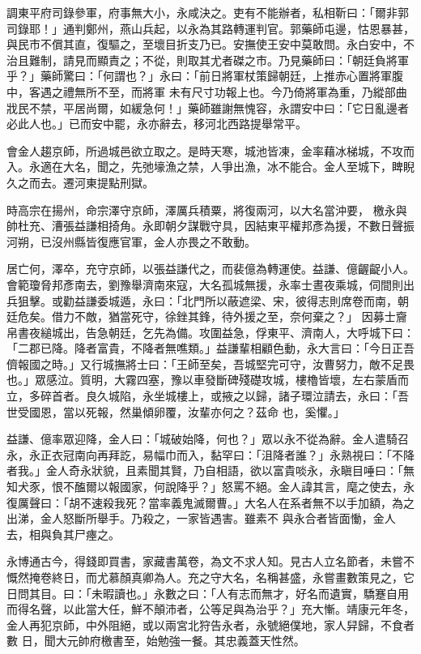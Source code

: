 \begin{pinyinscope}
 調東平府司錄參軍，府事無大小，永咸決之。吏有不能辦者，私相靳曰：「爾非郭司錄耶！」通判鄭州，燕山兵起，以永為其路轉運判官。郭藥師屯邊，怙恩暴甚，與民市不償其直，復驅之，至壞目折支乃已。安撫使王安中莫敢問。永白安中，不治且難制，請見而顯責之；不從，則取其尤者磔之市。乃見藥師曰：「朝廷負將軍乎？」藥師驚曰：「何謂也？」永曰：「前日將軍杖策歸朝廷，上推赤心置將軍腹中，客遇之禮無所不至，而將軍
 未有尺寸功報上也。今乃倚將軍為重，乃縱部曲戕民不禁，平居尚爾，如緩急何！」藥師雖謝無愧容，永謂安中曰：「它日亂邊者必此人也。」已而安中罷，永亦辭去，移河北西路提舉常平。



 會金人趨京師，所過城邑欲立取之。是時天寒，城池皆凍，金率藉冰梯城，不攻而入。永適在大名，聞之，先弛壕漁之禁，人爭出漁，冰不能合。金人至城下，睥睨久之而去。遷河東提點刑獄。



 時高宗在揚州，命宗澤守京師，澤厲兵積粟，將復兩河，以大名當沖要，
 檄永與帥杜充、漕張益謙相掎角。永即朝夕謀戰守具，因結東平權邦彥為援，不數日聲振河朔，已沒州縣皆復應官軍，金人亦畏之不敢動。



 居亡何，澤卒，充守京師，以張益謙代之，而裴億為轉運使。益謙、億齷齪小人。會範瓊脅邦彥南去，劉豫舉濟南來寇，大名孤城無援，永率士晝夜乘城，伺間則出兵狙擊。或勸益謙委城遁，永曰：「北門所以蔽遮梁、宋，彼得志則席卷而南，朝廷危矣。借力不敵，猶當死守，徐銼其鋒，待外援之至，奈何棄之？」
 因募士齎帛書夜縋城出，告急朝廷，乞先為備。攻圍益急，俘東平、濟南人，大呼城下曰：「二郡已降。降者富貴，不降者無噍類。」益謙輩相顧色動，永大言曰：「今日正吾儕報國之時。」又行城撫將士曰：「王師至矣，吾城堅完可守，汝曹努力，敵不足畏也。」眾感泣。質明，大霧四塞，豫以車發斷碑殘礎攻城，樓櫓皆壞，左右蒙盾而立，多碎首者。良久城陷，永坐城樓上，或掖之以歸，諸子環泣請去，永曰：「吾世受國恩，當以死報，然巢傾卵覆，汝輩亦何之？茲命
 也，奚懼。」



 益謙、億率眾迎降，金人曰：「城破始降，何也？」眾以永不從為辭。金人遣騎召永，永正衣冠南向再拜訖，易幅巾而入，黏罕曰：「沮降者誰？」永熟視曰：「不降者我。」金人奇永狀貌，且素聞其賢，乃自相語，欲以富貴啖永，永瞋目唾曰：「無知犬豕，恨不醢爾以報國家，何說降乎？」怒罵不絕。金人諱其言，麾之使去，永復厲聲曰：「胡不速殺我死？當率義鬼滅爾曹。」大名人在系者無不以手加額，為之出涕，金人怒斷所舉手。乃殺之，一家皆遇害。雖素不
 與永合者皆面慟，金人去，相與負其尸瘞之。



 永博通古今，得錢即買書，家藏書萬卷，為文不求人知。見古人立名節者，未嘗不慨然掩卷終日，而尤慕顏真卿為人。充之守大名，名稱甚盛，永嘗畫數策見之，它日問其目。曰：「未暇讀也。」永數之曰：「人有志而無才，好名而遺實，驕蹇自用而得名聲，以此當大任，鮮不顛沛者，公等足與為治乎？」充大慚。靖康元年冬，金人再犯京師，中外阻絕，或以兩宮北狩告永者，永號絕僕地，家人舁歸，不食者數
 日，聞大元帥府檄書至，始勉強一餐。其忠義蓋天性然。




\end{pinyinscope}
